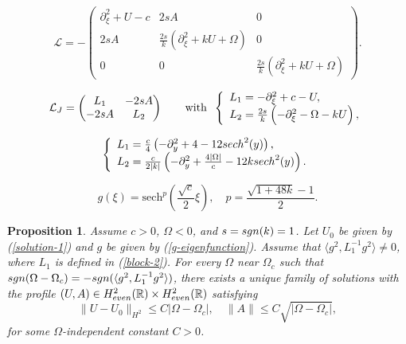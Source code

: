 \documentclass[10pt,a4paper]{amsart}
\newtheorem{proposition}{Proposition}
\begin{document}
\begin{equation}
    \label{Hessian}
\mathcal{L}=-\begin{pmatrix} \partial_{\xi}^2 + U - c & 2 s A & 0 \\ 
2 s A & \frac{2 s}{k}\left(\partial_{\xi}^2+kU+\Omega\right) & 0 \\
0&  0  &  \frac{2 s}{k}\left(\partial_{\xi}^2+kU+\Omega\right)
\end{pmatrix}.
\end{equation}

\begin{equation}
    \label{block-1}
    \mathcal{L}_J = 
\begin{pmatrix} L_1 & -2 s A  \\ 
-2 s A & L_2 
\end{pmatrix} \qquad
\mbox{\rm with} \;\; 
\left\{ \begin{array}{l} L_1 = -\partial_{\xi}^2 + c - U, \\
L_2 = \frac{2 s}{k} \left( - \partial_{\xi}^2 - \Omega - kU \right),
\end{array} \right.
\end{equation}

\begin{align}
\label{block-2}
\left\{ \begin{array}{l}
    L_1 = \frac{c}{4} \left( - \partial_y^2 + 4 - 12 {\rm sech}^2(y) \right), \\
    L_2 = \frac{c}{2 |k|} \left( - \partial_y^2 + \frac{4 |\Omega|}{c} - 12 k {\rm sech}^2(y) \right).
    \end{array} \right.
\end{align}

\begin{equation}
\label{g-eigenfunction}
    g(\xi) = \text{sech}^{p}\left( \frac{\sqrt{c}}{2} \xi\right), \quad p = \frac{\sqrt{1+48 k}-1}{2}.
\end{equation}

\begin{proposition}
    \label{theorem-bifurcation-first}
    Assume $c > 0$, $\Omega < 0$, and $s = {\rm sgn}(k) = 1$.
    Let $U_0$ be given by (\ref{solution-1}) and $g$ be given by (\ref{g-eigenfunction}). 
    Assume that $\langle g^2, L_1^{-1} g^2 \rangle \neq 0$, where $L_1$ is defined in (\ref{block-2}). 
    For every $\Omega$ near $\Omega_c$ such that ${\rm sgn}(\Omega - \Omega_c) = -{\rm sgn}(\langle g^2, L_1^{-1} g^2 \rangle)$, 
    there exists a unique family of solutions with the profile $(U,A) \in H^2_{\rm even}(\mathbb{R}) \times H^2_{\rm even}(\mathbb{R})$ satisfying 
    $$
    \| U - U_0 \|_{H^2} \leq C |\Omega - \Omega_c|, \quad \| A \| \leq C \sqrt{|\Omega - \Omega_c|},
    $$
    for some $\Omega$-independent constant $C > 0$.
\end{proposition}
\end{document}
